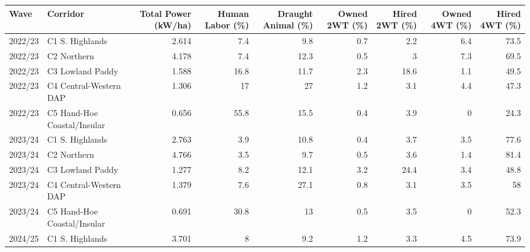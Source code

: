 \begin{tabular}{llrrrrrrr}
\toprule
 Wave    & Corridor                    &   Total Power (kW/ha) &   Human Labor (\%) &   Draught Animal (\%) &   Owned 2WT (\%) &   Hired 2WT (\%) &   Owned 4WT (\%) &   Hired 4WT (\%) \\
\midrule
 2022/23 & C1 S. Highlands             &                 2.614 &               7.4 &                  9.8 &             0.7 &             2.2 &             6.4 &            73.5 \\
 2022/23 & C2 Northern                 &                 4.178 &               7.4 &                 12.3 &             0.5 &             3   &             7.3 &            69.5 \\
 2022/23 & C3 Lowland Paddy            &                 1.588 &              16.8 &                 11.7 &             2.3 &            18.6 &             1.1 &            49.5 \\
 2022/23 & C4 Central-Western DAP      &                 1.306 &              17   &                 27   &             1.2 &             3.1 &             4.4 &            47.3 \\
 2022/23 & C5 Hand-Hoe Coastal/Insular &                 0.656 &              55.8 &                 15.5 &             0.4 &             3.9 &             0   &            24.3 \\
 2023/24 & C1 S. Highlands             &                 2.763 &               3.9 &                 10.8 &             0.4 &             3.7 &             3.5 &            77.6 \\
 2023/24 & C2 Northern                 &                 4.766 &               3.5 &                  9.7 &             0.5 &             3.6 &             1.4 &            81.4 \\
 2023/24 & C3 Lowland Paddy            &                 1.277 &               8.2 &                 12.1 &             3.2 &            24.4 &             3.4 &            48.8 \\
 2023/24 & C4 Central-Western DAP      &                 1.379 &               7.6 &                 27.1 &             0.8 &             3.1 &             3.5 &            58   \\
 2023/24 & C5 Hand-Hoe Coastal/Insular &                 0.691 &              30.8 &                 13   &             0.5 &             3.5 &             0   &            52.3 \\
 2024/25 & C1 S. Highlands             &                 3.701 &               8   &                  9.2 &             1.2 &             3.3 &             4.5 &            73.9 \\

\end{tabular}
